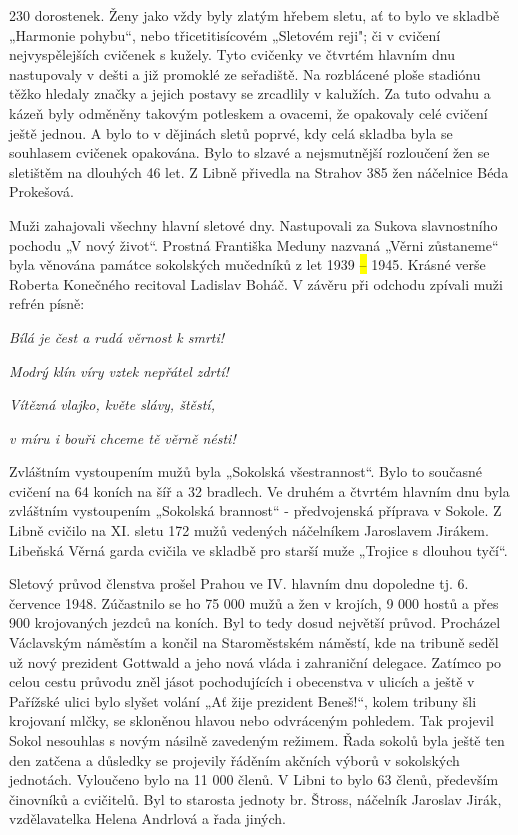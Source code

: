 230 dorostenek. Ženy jako vždy byly zlatým hřebem sletu, ať to bylo ve
skladbě „Harmonie pohybu``, nebo třicetitisícovém „Sletovém reji"; či v
cvičení nejvyspělejších cvičenek s kužely. Tyto cvičenky ve čtvrtém
hlavním dnu nastupovaly v dešti a již promoklé ze seřadiště. Na
rozblácené ploše stadiónu těžko hledaly značky a jejich postavy se
zrcadlily v kalužích. Za tuto odvahu a kázeň byly odměněny takovým
potleskem a ovacemi, že opakovaly celé cvičení ještě jednou. A bylo to v
dějinách sletů poprvé, kdy celá skladba byla se souhlasem cvičenek
opakována. Bylo to slzavé a nejsmutnější rozloučení žen se sletištěm na
dlouhých 46 let. Z Libně přivedla na Strahov 385 žen náčelnice Béda
Prokešová.

Muži zahajovali všechny hlavní sletové dny. Nastupovali za Sukova
slavnostního pochodu „V nový život``. Prostná Františka Meduny nazvaná
„Věrni zůstaneme`` byla věnována památce sokolských mučedníků z let 1939
\hl{--} 1945. Krásné verše Roberta Konečného recitoval Ladislav Boháč. V
závěru při odchodu zpívali muži refrén písně:

\emph{Bílá je čest a rudá věrnost k smrti!}

\emph{Modrý klín víry vztek nepřátel zdrtí!}

\emph{Vítězná vlajko, květe slávy, štěstí,}

\emph{v míru i bouři chceme tě věrně nésti!}

Zvláštním vystoupením mužů byla „Sokolská všestrannost``. Bylo to
současné cvičení na 64 koních na šíř a 32 bradlech. Ve druhém a čtvrtém
hlavním dnu byla zvláštním vystoupením „Sokolská brannost`` -
předvojenská příprava v Sokole. Z Libně cvičilo na XI. sletu 172 mužů
vedených náčelníkem Jaroslavem Jirákem. Libeňská Věrná garda cvičila ve
skladbě pro starší muže „Trojice s dlouhou tyčí``.

Sletový průvod členstva prošel Prahou ve IV. hlavním dnu dopoledne tj.
6. července 1948. Zúčastnilo se ho 75 000 mužů a žen v krojích, 9 000
hostů a přes 900 krojovaných jezdců na koních. Byl to tedy dosud
největší průvod. Procházel Václavským náměstím a končil na Staroměstském
náměstí, kde na tribuně seděl už nový prezident Gottwald a jeho nová
vláda i zahraniční delegace. Zatímco po celou cestu průvodu zněl jásot
pochodujících i obecenstva v ulicích a ještě v Pařížské ulici bylo
slyšet volání „Ať žije prezident Beneš!{}``, kolem tribuny šli krojovaní
mlčky, se skloněnou hlavou nebo odvráceným pohledem. Tak projevil Sokol
nesouhlas s novým násilně zavedeným režimem. Řada sokolů byla ještě ten
den zatčena a důsledky se projevily řáděním akčních výborů v sokolských
jednotách. Vyloučeno bylo na 11 000 členů. V Libni to bylo 63 členů,
především činovníků a cvičitelů. Byl to starosta jednoty br. Štross,
náčelník Jaroslav Jirák, vzdělavatelka Helena Andrlová a řada jiných.

